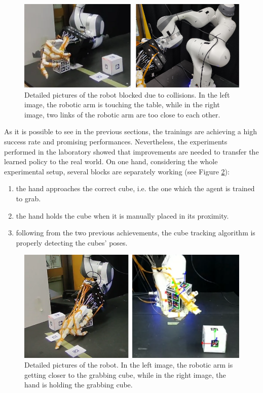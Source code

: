 \documentclass[a4paper]{article}
\begin{document}
\vspace{1cm}

\begin{figure}[!hb]
    \centering
    \includegraphics[scale=0.7]{images/collisions.png}
    \caption{Detailed pictures of the robot blocked due to collisions. In the left image, the robotic arm is touching the table, while in the right image, two links of the robotic arm are too close to each other.}
    \label{collisions}
\end{figure}

\newpage

As it is possible to see in the previous sections, the trainings are achieving a high success rate and promising performances. Nevertheless, the experiments performed in the laboratory showed that improvements are needed to transfer the learned policy to the real world.
On one hand, considering the whole experimental setup, several blocks are separately working (see Figure \ref{working}):
\begin{enumerate}
    \item the hand approaches the correct cube, i.e. the one which the agent is trained to grab.
    \item the hand holds the cube when it is manually placed in its proximity.
    \item following from the two previous achievements, the cube tracking algorithm is properly detecting the cubes' poses.
\end{enumerate}

\vspace{0.5cm}
\begin{figure}[!hb]
    \centering
    \includegraphics[scale=0.75]{images/working.png}
    \caption{Detailed pictures of the robot. In the left image, the robotic arm is getting closer to the grabbing cube, while in the right image, the hand is holding the grabbing cube.}
    \label{working}
\end{figure}
\vspace{0.5cm}
\end{document}
